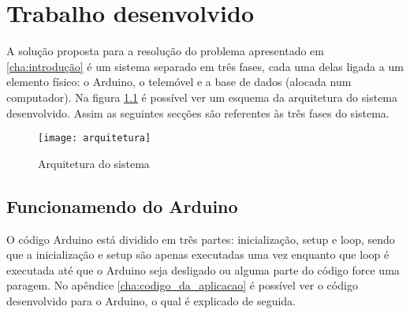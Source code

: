 \chapter{Trabalho desenvolvido}
\label{cha:trabalho desenvolvido}

A solução proposta para a resolução do problema apresentado em \ref{cha:introdução} é um sistema separado em três fases, cada uma delas ligada a um elemento físico: o Arduino, o telemóvel e a base de dados (alocada num computador). 
Na figura \ref{fig:arquitetura} é possível ver um esquema da arquitetura do sistema desenvolvido.
Assim as seguintes secções são referentes às três fases do sistema.

\begin{figure}[hbtp]
	\centering
	\texttt{[image: arquitetura]}
	\caption{Arquitetura do sistema}
	\label{fig:arquitetura}
\end{figure}

\section{Funcionamendo do Arduino}
\label{sec:funcionamento_do_arduino}
O código Arduino está dividido em três partes: inicialização, setup e loop, sendo que a inicialização e setup são apenas executadas uma vez enquanto que loop é executada até que o Arduino seja desligado ou alguma parte do código force uma paragem.
No apêndice \ref{cha:codigo_da_aplicacao} é possível ver o código desenvolvido para o Arduino, o qual é explicado de seguida.

